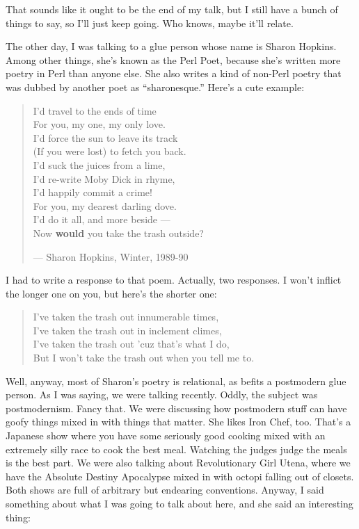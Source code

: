 \documentclass[10pt,letterpaper]{article}
\begin{document}
That sounds like it ought to be the end of my talk, but I still have a bunch
of things to say, so I'll just keep going. Who knows, maybe it'll relate.

The other day, I was talking to a glue person whose name is Sharon Hopkins.
Among other things, she's known as the Perl Poet, because she's written more
poetry in Perl than anyone else. She also writes a kind of non-Perl poetry
that was dubbed by another poet as ``sharonesque.'' Here's a cute example:

\begin{verse}
I'd travel to the ends of time\\
For you, my one, my only love.\\
I'd force the sun to leave its track\\
(If you were lost) to fetch you back.\\
I'd suck the juices from a lime,\\
I'd re-write Moby Dick in rhyme,\\
I'd happily commit a crime!\\
For you, my dearest darling dove.\\
I'd do it all, and more beside ---\\
 
Now {\bfseries would} you take the trash outside?

\hspace{1in}--- Sharon Hopkins, Winter, 1989-90
\end{verse}

\noindent I had to write a response to that poem. Actually, two responses. I won't
inflict the longer one on you, but here's the shorter one:

\begin{verse}
I've taken the trash out innumerable times,\\
I've taken the trash out in inclement climes,\\
I've taken the trash out 'cuz that's what I do,\\
But I won't take the trash out when you tell me to.\\
\end{verse}

\noindent Well, anyway, most of Sharon's poetry is relational, as befits a postmodern
glue person. As I was saying, we were talking recently. Oddly, the subject
was postmodernism. Fancy that. We were discussing how postmodern stuff can
have goofy things mixed in with things that matter. She likes Iron Chef, too.
That's a Japanese show where you have some seriously good cooking mixed with
an extremely silly race to cook the best meal. Watching the judges judge the
meals is the best part. We were also talking about Revolutionary Girl Utena,
where we have the Absolute Destiny Apocalypse mixed in with octopi falling
out of closets. Both shows are full of arbitrary but endearing conventions.
Anyway, I said something about what I was going to talk about here, and she
said an interesting thing:
\end{document}
